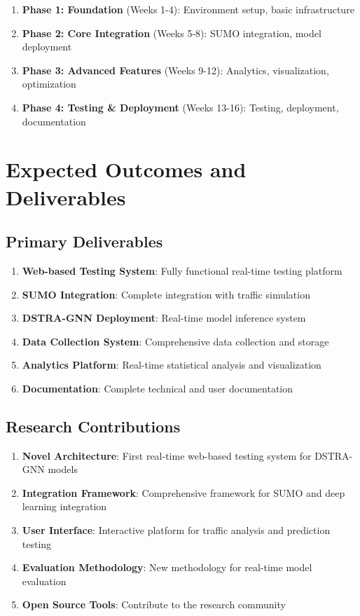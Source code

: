 \documentclass[12pt,a4paper]{article}
\begin{document}
\begin{enumerate}
    \item \textbf{Phase 1: Foundation} (Weeks 1-4): Environment setup, basic infrastructure
    \item \textbf{Phase 2: Core Integration} (Weeks 5-8): SUMO integration, model deployment
    \item \textbf{Phase 3: Advanced Features} (Weeks 9-12): Analytics, visualization, optimization
    \item \textbf{Phase 4: Testing \& Deployment} (Weeks 13-16): Testing, deployment, documentation
\end{enumerate}

\section{Expected Outcomes and Deliverables}

\subsection{Primary Deliverables}

\begin{enumerate}
    \item \textbf{Web-based Testing System}: Fully functional real-time testing platform
    \item \textbf{SUMO Integration}: Complete integration with traffic simulation
    \item \textbf{DSTRA-GNN Deployment}: Real-time model inference system
    \item \textbf{Data Collection System}: Comprehensive data collection and storage
    \item \textbf{Analytics Platform}: Real-time statistical analysis and visualization
    \item \textbf{Documentation}: Complete technical and user documentation
\end{enumerate}

\subsection{Research Contributions}

\begin{enumerate}
    \item \textbf{Novel Architecture}: First real-time web-based testing system for DSTRA-GNN models
    \item \textbf{Integration Framework}: Comprehensive framework for SUMO and deep learning integration
    \item \textbf{User Interface}: Interactive platform for traffic analysis and prediction testing
    \item \textbf{Evaluation Methodology}: New methodology for real-time model evaluation
    \item \textbf{Open Source Tools}: Contribute to the research community
\end{enumerate}
\end{document}

